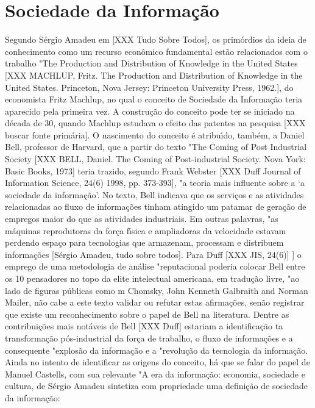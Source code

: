 \documentclass[
12pt,		%
openright,	%
twoside,  %
a4paper,			%
chapter=TITLE,		%
english,			%
french,				%
spanish,			%
brazil				%
]{USPSC-classe/USPSC}
\begin{document}
\section[Sociedade da Informa\c{c}\~ao]{Sociedade da Informa\c{c}\~ao}\label{Sociedade da Informa\c{c}\~ao}
Segundo S\'ergio Amadeu em [XXX Tudo Sobre Todos], os prim\'ordios da ideia de conhecimento como um recurso econ\^omico fundamental est\~ao relacionados com o trabalho "The Production and Distribution of Knowledge in the United States [XXX MACHLUP, Fritz. The Production and Distribution of Knowledge in the United States. Princeton, Nova Jersey: Princeton University Press, 1962.], do economista Fritz Machlup, no qual o conceito de Sociedade da Informa\c{c}\~ao teria aparecido pela primeira vez. A constru\c{c}\~ao do conceito pode ter se iniciado na d\'ecada de 30, quando Machlup estudava o efeito das patentes na pesquisa [XXX buscar fonte prim\'aria]. O nascimento do conceito \'e atribu\'{\i}do, tamb\'em, a Daniel Bell, professor de Harvard, que a partir do texto "The Coming of Post Industrial Society [XXX BELL, Daniel. The Coming of Post-industrial Society. Nova York: Basic Books, 1973] teria trazido, segundo Frank Webster [XXX Duff Journal of Information Science, 24(6) 1998, pp. 373-393], "a teoria mais influente sobre a ‘a sociedade da informa\c{c}\~ao’. No texto, Bell indicava que os servi\c{c}os e as atividades relacionadas ao fluxo de informa\c{c}\~oes tinham atingido um patamar de gera\c{c}\~ao de empregos maior do que as atividades industriais. Em outras palavras, "as m\'aquinas reprodutoras da for\c{c}a f\'{\i}sica e ampliadoras da velocidade estavam perdendo espa\c{c}o para tecnologias que armazenam, processam e distribuem informa\c{c}\~oes [S\'ergio Amadeu, tudo sobre todos]. Para Duff [XXX JIS, 24(6)] ] o emprego de uma metodologia de an\'alise "reputacional poderia colocar Bell entre os 10 pensadores no topo da elite intelectual americana, em tradu\c{c}\~ao livre, "ao lado de figuras p\'ublicas como m Chomsky, John Kenneth Galbraith and Norman Mailer, n\~ao cabe a este texto validar ou refutar estas afirma\c{c}\~oes, sen\~ao registrar que existe um reconhecimento sobre o papel de Bell na literatura. Dentre as contribui\c{c}\~oes mais not\'aveis de Bell [XXX Duff] estariam a identifica\c{c}\~ao ta transforma\c{c}\~ao p\'os-industrial da for\c{c}a de trabalho, o fluxo de informa\c{c}\~oes e a consequente "explos\~ao da informa\c{c}\~ao e a "revolu\c{c}\~ao da tecnologia da informa\c{c}\~ao. 
Ainda no intento de identificar as origens do conceito, h\'a que se falar do papel de Manuel Castells, com sua relevante "A era da informa\c{c}\~ao: economia, sociedade e cultura, de 
S\'ergio Amadeu sintetiza com propriedade uma defini\c{c}\~ao de sociedade da informa\c{c}\~ao: 
\end{document}
